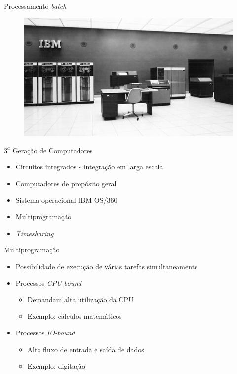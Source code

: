 \documentclass[aspectratio=169,
				xcolor=table]{beamer}
\begin{document}
	\begin{frame}{Processamento \textit{batch}}
	\begin{figure}[hbtp]
	\centering
	\includegraphics[height=.75\textheight, keepaspectratio]{../figs/cap01/ibmroom}
	\end{figure}
	\end{frame}
	
	\begin{frame}{${3}^{a}$ Geração de Computadores}
		\begin{itemize}
			\item Circuitos integrados - Integração em larga escala
			\vspace{1em}
			\item Computadores de propósito geral
			\vspace{1em}
			\item Sistema operacional IBM OS/360
			\vspace{1em}
			\item \alert{Multiprogramação}
			\vspace{1em}
			\item \alert{\textit{Timesharing}}
		\end{itemize}
	\end{frame}
	
	\begin{frame}{Multiprogramação}
		\begin{itemize}
			\item Possibilidade de execução de várias tarefas simultaneamente
			\item Processos \textit{CPU-bound}
			\begin{itemize}
				\item Demandam alta utilização da CPU
				\item Exemplo: cálculos matemáticos
			\end{itemize}
			\item Processos \textit{IO-bound}
			\begin{itemize}
				\item Alto fluxo de entrada e saída de dados
				\item Exemplo: digitação
			\end{itemize}
		\end{itemize}
	\end{frame}
	
\end{document}
